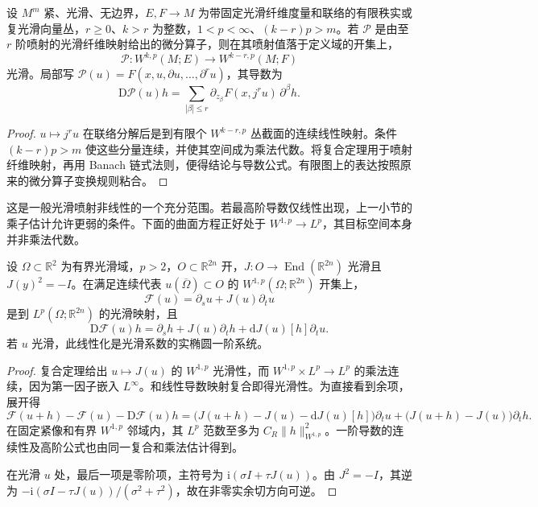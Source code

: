 \begin{proposition}\label{g3:prop:nonlinear-jet-operator}
	设 \(M^m\) 紧、光滑、无边界，\(E,F\to M\) 为带固定光滑纤维度量和联络的有限秩实或复光滑向量丛，\(r\ge0\)、\(k>r\) 为整数，\(1<p<\infty\)、\((k-r)p>m\)。若 \(\mathcal P\) 是由至 \(r\) 阶喷射的光滑纤维映射给出的微分算子，则在其喷射值落于定义域的开集上，
	\[
		\mathcal P:W^{k,p}(M;E)\longrightarrow W^{k-r,p}(M;F)
	\]
	光滑。局部写 \(\mathcal P(u)=F(x,u,\partial u,\ldots,\partial^r u)\)，其导数为
	\[
		\mathrm D\mathcal P(u)h
		=\sum_{|\beta|\le r}\partial_{z_\beta}F(x,j^ru)\,\partial^\beta h.
	\]
\end{proposition}
\begin{proof}
	\(u\mapsto j^ru\) 在联络分解后是到有限个 \(W^{k-r,p}\) 丛截面的连续线性映射。条件 \((k-r)p>m\) 使这些分量连续，并使其空间成为乘法代数。将复合定理用于喷射纤维映射，再用 Banach 链式法则，便得结论与导数公式。有限图上的表达按照原来的微分算子变换规则粘合。
\end{proof}

这是一般光滑喷射非线性的一个充分范围。若最高阶导数仅线性出现，上一小节的乘子估计允许更弱的条件。下面的曲面方程正好处于 \(W^{1,p}\to L^p\)，其目标空间本身并非乘法代数。

\begin{theorem}\label{g3:thm:cr-nonlinear-smooth}
	设 \(\Omega\subset\mathbb R^2\) 为有界光滑域，\(p>2\)，\(O\subset\mathbb R^{2n}\) 开，\(J:O\to\operatorname{End}(\mathbb R^{2n})\) 光滑且 \(J(y)^2=-I\)。在满足连续代表 \(u(\overline\Omega)\subset O\) 的 \(W^{1,p}(\Omega;\mathbb R^{2n})\) 开集上，
	\[
		\mathcal F(u)=\partial_su+J(u)\partial_tu
	\]
	是到 \(L^p(\Omega;\mathbb R^{2n})\) 的光滑映射，且
	\begin{equation}\label{g3:eq:cr-nonlinear-derivative}
		\mathrm D\mathcal F(u)h
		=\partial_sh+J(u)\partial_th
		+\mathrm dJ(u)[h]\partial_tu.
	\end{equation}
	若 \(u\) 光滑，此线性化是光滑系数的实椭圆一阶系统。
\end{theorem}
\begin{proof}
	复合定理给出 \(u\mapsto J(u)\) 的 \(W^{1,p}\) 光滑性，而
	\(W^{1,p}\times L^p\to L^p\) 的乘法连续，因为第一因子嵌入 \(L^\infty\)。和线性导数映射复合即得光滑性。为直接看到余项，展开得
	\[
		\mathcal F(u+h)-\mathcal F(u)-\mathrm D\mathcal F(u)h
		=\bigl(J(u+h)-J(u)-\mathrm dJ(u)[h]\bigr)\partial_tu
		+\bigl(J(u+h)-J(u)\bigr)\partial_th.
	\]
	在固定紧像和有界 \(W^{1,p}\) 邻域内，其 \(L^p\) 范数至多为 \(C_R\|h\|_{W^{1,p}}^2\)。一阶导数的连续性及高阶公式也由同一复合和乘法估计得到。

	在光滑 \(u\) 处，最后一项是零阶项，主符号为
	\(\mathrm i(\sigma I+\tau J(u))\)。由 \(J^2=-I\)，其逆为
	\(-\mathrm i(\sigma I-\tau J(u))/(\sigma^2+\tau^2)\)，故在非零实余切方向可逆。
\end{proof}

